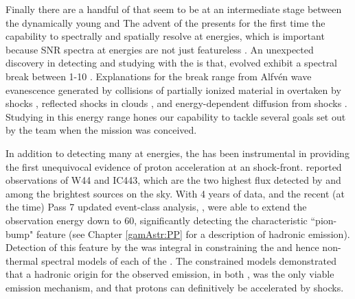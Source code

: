 Finally there are  a handful of \snrs{} that seem to be at an intermediate stage between the dynamically young and 
The advent of the \lat{} presents for the first time the capability to spectrally and spatially resolve \snrs{} at \gev{} energies, which is important because SNR spectra at \gev{} energies are not just featureless \pl{}. An unexpected discovery in detecting and studying \snrs{} with the \lat{} is that, evolved \snrs{} exhibit a spectral break between 1-10\gev{} \citep{Hewitt15}. Explanations for the break range from Alfv\' en wave evanescence generated by collisions of partially ionized material in \mcs{} overtaken by \snr{}  shocks \citep{Malkov11}, reflected shocks in clouds \cite{Inoue10c}, and energy-dependent diffusion from shocks \cite{Ohira11}. Studying \snrs{} in this energy range hones our capability to tackle several goals set out by the \Fermi{} team when the mission was conceived.

In addition to detecting many \snrs{} at \gam{} energies, the \lat{} has been instrumental in providing the first unequivocal evidence of proton acceleration at an \snr{} shock-front. \cite{W44pion} reported observations of  \snrs{} W44 and IC443, which are the two highest flux \snrs{} detected by \lat{} and among the brightest \lat{} sources on the sky. With 4 years of data, and the recent (at the time) Pass 7 updated event-class analysis, \cite{W44pion}, were able to extend the observation energy down to 60\mev{}, significantly detecting the characteristic ``pion-bump" feature (see Chapter \ref{gamAstr:PP} for a description of hadronic \gam{} emission). Detection of this feature by the \lat{} was integral in constraining the \sed{} and hence non-thermal spectral models of each of the \snrs{}. The constrained models demonstrated that a hadronic origin for the observed emission, in both \snrs{}, was the only viable emission mechanism, and that protons can definitively be accelerated by \snr{} shocks.

